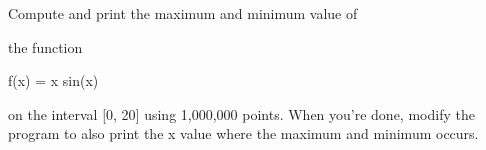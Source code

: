 Compute and print the maximum and minimum value of

the function

\begin{center}

f(x) = x sin(x)

\end{center}

on the interval [0, 20] using 1,000,000 points. When you're done, modify the program to also print the x value where the maximum and minimum occurs.

